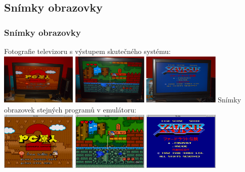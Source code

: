 \documentclass[10pt]{beamer}
\begin{document}
\subsection{Snímky obrazovky}
\begin{frame}
\frametitle{Snímky obrazovky}
Fotografie televizoru s výstupem skutečného systému: \\
\vglue 0.1cm
\includegraphics[width=3.6cm]{fig/pce_ss1}
\includegraphics[width=3.6cm]{fig/pce_ss2}
\includegraphics[width=3.6cm]{fig/pce_ss3}
\vglue 0.2cm
Snímky obrazovek stejných programů v emulátoru: \\
\vglue 0.1cm
\includegraphics[width=3.6cm]{fig/bc_emu_ss1}
\includegraphics[width=3.6cm]{fig/bc_emu_ss2}
\includegraphics[width=3.6cm]{fig/bc_emu_ss3}
\end{frame}
\end{document}
